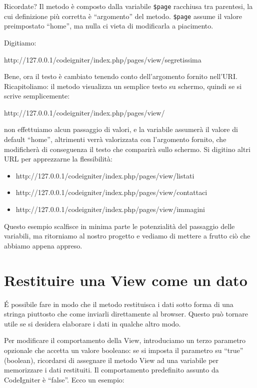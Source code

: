 Ricordate? Il metodo  è composto dalla variabile \verb|$page| racchiusa tra parentesi, la cui definizione più corretta è ``argomento'' del metodo. \verb|$page| assume il valore preimpostato ``home'', ma nulla ci vieta di modificarla a piacimento.

Digitiamo:

\begin{code}
http://127.0.0.1/codeigniter/index.php/pages/view/segretissima
\end{code}

Bene, ora il testo è cambiato tenendo conto dell'argomento  fornito nell'\ac{URI}. Ricapitoliamo: il metodo  visualizza un semplice testo su schermo, quindi se si scrive semplicemente:

\begin{code}
http://127.0.0.1/codeigniter/index.php/pages/view/
\end{code}

non effettuiamo alcun passaggio di valori, e la variabile  assumerà il valore di default ``home'', altrimenti verrà valorizzata con l'argomento fornito, che modificherà di conseguenza il testo che comparirà sullo schermo. Si digitino altri \ac{URL} per apprezzarne la flessibilità:

\begin{itemize}
\item http://127.0.0.1/codeigniter/index.php/pages/view/listati
\item http://127.0.0.1/codeigniter/index.php/pages/view/contattaci
\item http://127.0.0.1/codeigniter/index.php/pages/view/immagini
\end{itemize}

Questo esempio scalfisce in minima parte le potenzialità del passaggio delle variabili, ma ritorniamo al nostro progetto e vediamo di mettere a frutto ciò che abbiamo appena appreso.

\section{Restituire una View come un dato}
\'E possibile fare in modo che il metodo restituisca i dati sotto forma di una stringa piuttosto che come inviarli direttamente al browser. Questo può tornare utile se si desidera elaborare i dati in qualche altro modo. 

Per modificare il comportamento della View, introduciamo un terzo parametro opzionale  che accetta un valore booleano: se si imposta il parametro su ``true'' (boolean), ricordarsi di assegnare il metodo View ad una variabile per memorizzare i dati restituiti. Il comportamento predefinito assunto da CodeIgniter è ``false''. Ecco un esempio:

